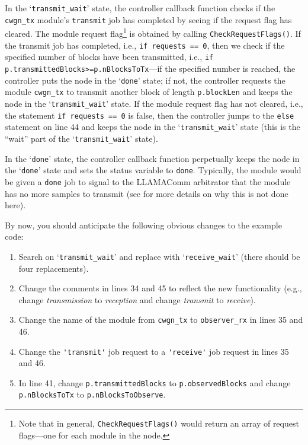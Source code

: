 In the `\verb+transmit_wait+' state, the controller callback function checks if the \verb+cwgn_tx+ module's \verb+transmit+ job has completed by seeing if the request flag has cleared.  The module request flag\footnote{Note that in general, {\tt CheckRequestFlags()} would return an array of request flags---one for each module in the node.} is obtained by calling \verb+CheckRequestFlags()+.  If the transmit job has completed, i.e., \verb+if requests == 0+, then we check if the specified number of blocks have been transmitted, i.e., \verb+if p.transmittedBlocks>=p.nBlocksToTx+---if the specified number is reached, the controller puts the node in the `\verb+done+' state; if not, the controller requests the module \verb+cwgn_tx+ to transmit another block of length \verb+p.blockLen+ and keeps the node in the `\verb+transmit_wait+' state.  If the module request flag has not cleared, i.e., the statement \verb+if requests == 0+ is false, then the controller jumps to the \verb+else+ statement on line 44 and keeps the node in the `\verb+transmit_wait+' state (this is the ``wait'' part of the `\verb+transmit_wait+' state).

In the `\verb+done+' state, the controller callback function perpetually keeps the node in the `\verb+done+' state and sets the status variable to \verb+done+.  Typically, the module would be given a \verb+done+ job to signal to the LLAMAComm arbitrator that the module has no more samples to transmit (see  for more details on why this is not done here).

By now, you should anticipate the following obvious changes to the example code:
\setcounter{enumitemp}{\theenumi}
\begin{enumerate}
\setcounter{enumi}{\theenumitemp}
\item Search on `\verb+transmit_wait+' and replace with `\verb+receive_wait+' (there should be four replacements).

\item Change the comments in lines 34 and 45 to reflect the new functionality (e.g., change \emph{transmission} to \emph{reception} and change \emph{transmit} to \emph{receive}).

\item Change the name of the module from \verb+cwgn_tx+ to \verb+observer_rx+ in lines 35 and 46.

\item Change the \verb+'transmit'+ job request to a \verb+'receive'+ job request in lines 35 and 46.

\item In line 41, change \verb+p.transmittedBlocks+ to \verb+p.observedBlocks+ and change \verb+p.nBlocksToTx+ to \verb+p.nBlocksToObserve+.

\end{enumerate}

